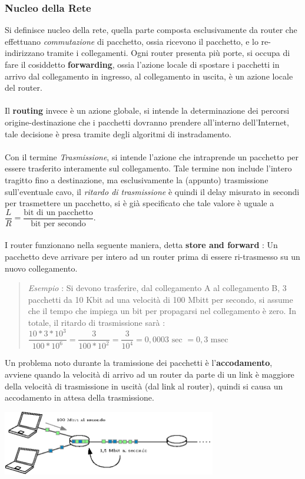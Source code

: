 \documentclass[12pt, letterpaper]{article}
\newcommand{\acc}{\\\hphantom{}\\}
\begin{document}
\subsubsection{Nucleo della Rete}
Si definisce nucleo della rete, quella parte composta esclusivamente da router  che effettuano \textit{commutazione} di pacchetto, ossia 
ricevono il pacchetto, e lo re-indirizzano tramite i collegamenti. Ogni router presenta più porte, si occupa di fare il 
cosiddetto \textbf{forwarding}, ossia l'azione locale di spostare i pacchetti in arrivo dal collegamento in ingresso, al collegamento 
in uscita, è un azione locale del router.\acc 
Il \textbf{routing} invece è un azione globale, si intende la determinazione dei percorsi origine-destinazione che i pacchetti 
dovranno prendere all'interno dell'Internet, tale decisione è presa tramite degli algoritmi di instradamento.\acc 
Con il termine \textit{Trasmissione}, si intende l'azione che intraprende un pacchetto per essere trasferito interamente 
sul collegamento. Tale termine non include l'intero tragitto fino a destinazione, ma esclusivamente la (appunto) trasmissione sull'eventuale 
cavo, il \textit{ritardo di trasmissione} è quindi il delay misurato in secondi per trasmettere un pacchetto, si è già specificato che tale 
valore è uguale a $\dfrac{L}{R}=\dfrac{\text{bit di un pacchetto}}{\text{bit per secondo}}$.\acc 
I router funzionano nella seguente maniera, detta \textbf{store and forward} : Un pacchetto deve arrivare per intero ad un router 
prima di essere ri-trasmesso su un nuovo collegamento.\begin{quote}
    \color{gray} \textit{Esempio} : Si devono trasferire, dal collegamento A al collegamento B, 3 pacchetti da 10 Kbit ad una 
    velocità di 100 Mbitt per secondo, si assume che il  tempo che impiega un bit per propagarsi nel collegamento è zero. 
    In totale, il ritardo di trasmissione sarà : $\dfrac{10*3*10^3}{100*10^6}=\dfrac{3}{100*10^2}=\dfrac{3}{10^4}=0,0003\text{ sec }=0,3\text{ msec }$
    \color{black}
\end{quote}
Un problema noto durante la tramissione dei pacchetti è l'\textbf{accodamento}, avviene quando la velocità di arrivo ad 
un router da parte di un link è maggiore della velocità di trasmissione in uscità (dal link al router), quindi si causa un 
accodamento in attesa della trasmissione.\begin{center}
    \includegraphics[width=0.7\textwidth ]{images/accodamento.ip.eps}
\end{center}
\end{document}
